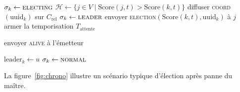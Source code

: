\begin{algorithm}[H]
\caption{Initiation d'une élection par le nœud $k$}
\begin{algorithmic}[1]
    \State $\sigma_k \gets \textsc{electing}$
    \State $\mathcal{H} \gets \{ j \in V \mid \mathrm{Score}(j,t) > \mathrm{Score}(k,t) \}$
        \State diffuser \textsc{coord}$(\mathrm{uuid}_k)$ sur $C_{\mathrm{rel}}$
        \State $\sigma_k \gets \textsc{leader}$
    \Else
            \State envoyer \textsc{election}$(\mathrm{Score}(k,t), \mathrm{uuid}_k)$ à $j$
        \EndFor
        \State armer la temporisation $T_{\mathrm{attente}}$
    \EndIf
\EndProcedure
\end{algorithmic}
\end{algorithm}

\begin{algorithm}[H]
\caption{Traitement des messages d'élection}
\begin{algorithmic}[1]
        \State envoyer \textsc{alive} à l'émetteur
        \State {}
    \EndIf
\EndProcedure

    \State $\mathrm{leader}_k \gets u$
    \State $\sigma_k \gets \textsc{normal}$
\EndProcedure
\end{algorithmic}
\end{algorithm}

La figure~\ref{fig:chrono} illustre un scénario typique d'élection après panne du maître.

